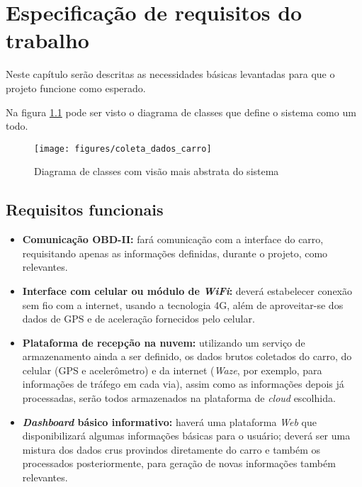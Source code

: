 \chapter{Especificação de requisitos do trabalho}

\label{CAP4}



Neste capítulo serão descritas as necessidades básicas levantadas para que o projeto funcione como esperado.

Na figura \ref{fig:class_diagram} pode ser visto o diagrama de classes que define o sistema como um todo.

\begin{figure}[hp]
    \centering
    
    \texttt{[image: figures/coleta\_dados\_carro]}
    
    \caption{Diagrama de classes com visão mais abstrata do sistema}
    
    \label{fig:class_diagram}
\end{figure}

\section{Requisitos funcionais}
\begin{itemize}
    \item \textbf{Comunicação OBD-II:} fará comunicação com a interface do carro, requisitando apenas as informações definidas, durante o projeto, como relevantes.
    
    \item \textbf{Interface com celular ou módulo de \textit{WiFi}:} deverá estabelecer conexão sem fio com a internet, usando a tecnologia 4G, além de aproveitar-se dos dados de GPS e de aceleração fornecidos pelo celular.
    
    \item \textbf{Plataforma de recepção na nuvem:} utilizando um serviço de armazenamento ainda a ser definido, os dados brutos coletados do carro, do celular (GPS e acelerômetro) e da internet (\textit{Waze}, por exemplo, para informações de tráfego em cada via), assim como as informações depois já processadas, serão todos armazenados na plataforma de \textit{cloud} escolhida.
    
    \item \textbf{\textit{Dashboard} básico informativo:} haverá uma plataforma \textit{Web} que disponibilizará algumas informações básicas para o usuário; deverá ser uma mistura dos dados crus provindos diretamente do carro e também os processados posteriormente, para geração de novas informações também relevantes.
\end{itemize}

